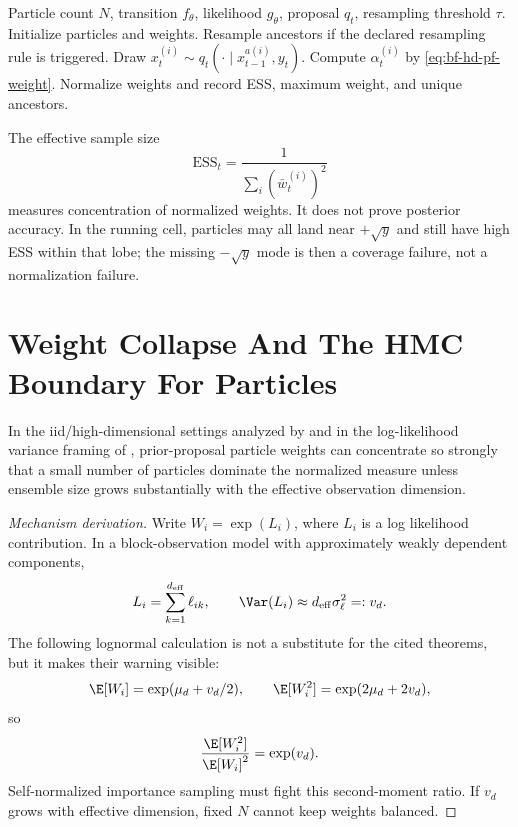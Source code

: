\begin{algorithm}
\caption{Sequential importance resampling filter}
\label{alg:bf-hd-sir-filter}
\begin{algorithmic}[1]
\Require Particle count \(N\), transition \(f_\theta\), likelihood
  \(g_\theta\), proposal \(q_t\), resampling threshold \(\tau\).
\State Initialize particles and weights.
  \State Resample ancestors if the declared resampling rule is triggered.
  \State Draw \(x_t^{(i)}\sim q_t(\cdot\mid x_{t-1}^{a(i)},y_t)\).
  \State Compute \(\alpha_t^{(i)}\) by \eqref{eq:bf-hd-pf-weight}.
  \State Normalize weights and record ESS, maximum weight, and unique ancestors.
\EndFor
\end{algorithmic}
\end{algorithm}

The effective sample size
\begin{equation}
  \mathrm{ESS}_t=\frac{1}{\sum_i(\bar w_t^{(i)})^2}
  \label{eq:bf-hd-ess}
\end{equation}
measures concentration of normalized weights.  It does not prove posterior
accuracy.  In the running cell, particles may all land near \(+\sqrt y\) and
still have high ESS within that lobe; the missing \(-\sqrt y\) mode is then a
coverage failure, not a normalization failure.

\section{Weight Collapse And The HMC Boundary For Particles}
\label{sec:bf-hd-pf-collapse}

\begin{proposition}
\label{prop:bf-hd-pf-collapse}
In the iid/high-dimensional settings analyzed by \citet{bengtsson2008curse}
and in the log-likelihood variance framing of \citet{snyder2008obstacles},
prior-proposal particle weights can concentrate so strongly that a small
number of particles dominate the normalized measure unless ensemble size grows
substantially with the effective observation dimension.
\end{proposition}

\begin{proof}[Mechanism derivation]
Write \(W_i=\exp(L_i)\), where \(L_i\) is a log likelihood contribution.  In a
block-observation model with approximately weakly dependent components,
\[
  L_i=\sum_{k=1}^{d_{\rm eff}}\ell_{ik},\qquad
  \Var(L_i)\approx d_{\rm eff}\sigma_\ell^2=:v_d.
\]
The following lognormal calculation is not a substitute for the cited
theorems, but it makes their warning visible:
\[
  \E[W_i]=\exp(\mu_d+v_d/2),\qquad
  \E[W_i^2]=\exp(2\mu_d+2v_d),
\]
so
\[
  \frac{\E[W_i^2]}{\E[W_i]^2}=\exp(v_d).
\]
Self-normalized importance sampling must fight this second-moment ratio.  If
\(v_d\) grows with effective dimension, fixed \(N\) cannot keep weights
balanced.
\end{proof}

